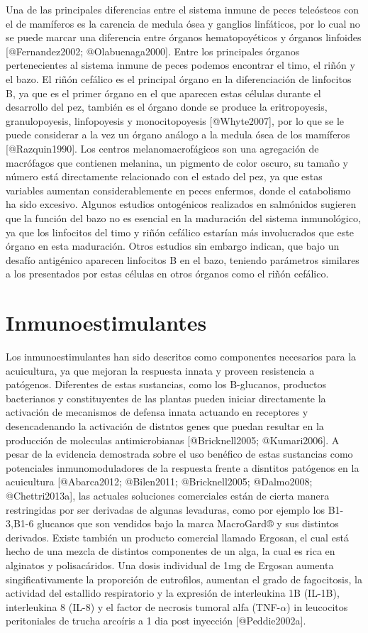 Una de las principales diferencias entre el sistema inmune de peces teleósteos con el de mamíferos es la carencia de medula ósea y ganglios linfáticos, por lo cual no se puede marcar una diferencia entre órganos hematopoyéticos y órganos linfoides [@Fernandez2002; @Olabuenaga2000]⁠. Entre los principales órganos pertenecientes al sistema inmune de peces podemos encontrar el timo, el riñón y el bazo. El riñón cefálico es el principal órgano en la diferenciación de linfocitos B, ya que es el primer órgano en el que aparecen estas células durante el desarrollo del pez, también es el órgano donde se produce la eritropoyesis, granulopoyesis, linfopoyesis y monocitopoyesis [@Whyte2007], por lo que se le puede considerar a la vez un órgano análogo a la medula ósea de los mamíferos [@Razquin1990]⁠. Los centros melanomacrofágicos son una agregación de macrófagos que contienen melanina, un pigmento de color oscuro, su tamaño y número está directamente relacionado con el estado del pez, ya que estas variables aumentan considerablemente en peces enfermos, donde el catabolismo ha sido excesivo. Algunos estudios ontogénicos realizados en salmónidos sugieren que la función del bazo no es esencial en la maduración del sistema inmunológico, ya que los linfocitos del timo y riñón cefálico estarían más involucrados que este órgano en esta maduración. Otros estudios sin embargo indican, que bajo un desafío antigénico aparecen linfocitos B en el bazo, teniendo parámetros similares a los presentados por estas células en otros órganos como el riñón cefálico.
\section{Inmunoestimulantes}

Los inmunoestimulantes han sido descritos como componentes necesarios para la acuicultura, ya que mejoran la respuesta innata y proveen resistencia a patógenos. Diferentes de estas sustancias, como los B-glucanos, productos bacterianos y constituyentes de las plantas pueden iniciar directamente la activación de mecanismos de defensa innata actuando en receptores y desencadenando la activación de distntos genes que puedan resultar en la producción de moleculas antimicrobianas [@Bricknell2005; @Kumari2006].
A pesar de la evidencia demostrada sobre el uso benéfico de estas sustancias como potenciales inmunomoduladores de la respuesta frente a disntitos patógenos en la acuicultura [@Abarca2012; @Bilen2011; @Bricknell2005; @Dalmo2008; @Chettri2013a], las actuales soluciones comerciales están de cierta manera restringidas por ser derivadas de algunas levaduras, como por ejemplo los B1-3,B1-6 glucanos que son vendidos bajo la marca MacroGard® y sus distintos derivados. Existe también un producto comercial llamado Ergosan, el cual está hecho de una mezcla de distintos componentes de un alga, la cual es rica en alginatos y polisacáridos. Una dosis individual de 1mg de Ergosan aumenta singificativamente la proporción de eutrofilos, aumentan el grado de fagocitosis, la actividad del estallido respiratorio y la expresión de interleukina 1B (IL-1B), interleukina 8 (IL-8) y el factor de necrosis tumoral alfa (TNF-$\alpha$) in leucocitos peritoniales de trucha arcoíris a 1 dia post inyección [@Peddie2002a].

